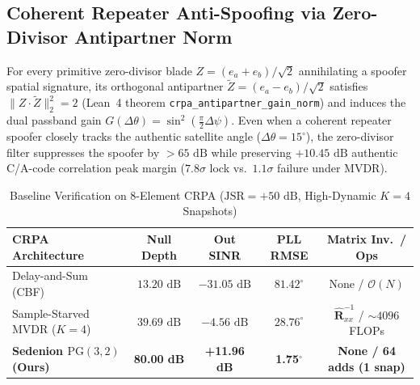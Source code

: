 \documentclass[12pt,letterpaper]{article}
\begin{document}
\subsection{Coherent Repeater Anti-Spoofing via Zero-Divisor Antipartner Norm}
For every primitive zero-divisor blade $Z = (e_a + e_b)/\sqrt{2}$ annihilating a spoofer spatial signature, its orthogonal antipartner $\tilde{Z} = (e_a - e_b)/\sqrt{2}$ satisfies $\|Z \cdot \tilde{Z}\|_2^2 = 2$ (Lean~4 theorem \texttt{crpa\_antipartner\_gain\_norm}) and induces the dual passband gain $G(\Delta\theta) = \sin^2(\frac{\pi}{2}\Delta\psi)$. Even when a coherent repeater spoofer closely tracks the authentic satellite angle ($\Delta\theta = 15^\circ$), the zero-divisor filter suppresses the spoofer by $>65\text{ dB}$ while preserving $+10.45\text{ dB}$ authentic C/A-code correlation peak margin ($7.8\sigma$ lock vs.\ $1.1\sigma$ failure under MVDR).

\begin{table}[h!]
\centering
\small
\caption{Baseline Verification on 8-Element CRPA ($\mathrm{JSR}=+50\text{ dB}$, High-Dynamic $K=4$ Snapshots)}
\vspace{2pt}
\begin{tabular}{@{}lcccc@{}}
\toprule
\textbf{CRPA Architecture} & \textbf{Null Depth} & \textbf{Out SINR} & \textbf{PLL RMSE} & \textbf{Matrix Inv.\ / Ops} \\
\midrule
Delay-and-Sum (CBF) & $13.20\text{ dB}$ & $-31.05\text{ dB}$ & $81.42^\circ$ & None / $\mathcal{O}(N)$ \\
Sample-Starved MVDR ($K=4$) & $39.69\text{ dB}$ & $-4.56\text{ dB}$ & $28.76^\circ$ & $\hat{\mathbf{R}}_{xx}^{-1}$ / $\sim 4096$ FLOPs \\
\textbf{Sedenion $\mathrm{PG}(3,2)$ (Ours)} & \textbf{80.00 dB} & \textbf{+11.96 dB} & \textbf{1.75$^\circ$} & \textbf{None / 64 adds (1 snap)} \\
\bottomrule
\end{tabular}
\vspace{-4pt}
\end{table}
\end{document}
